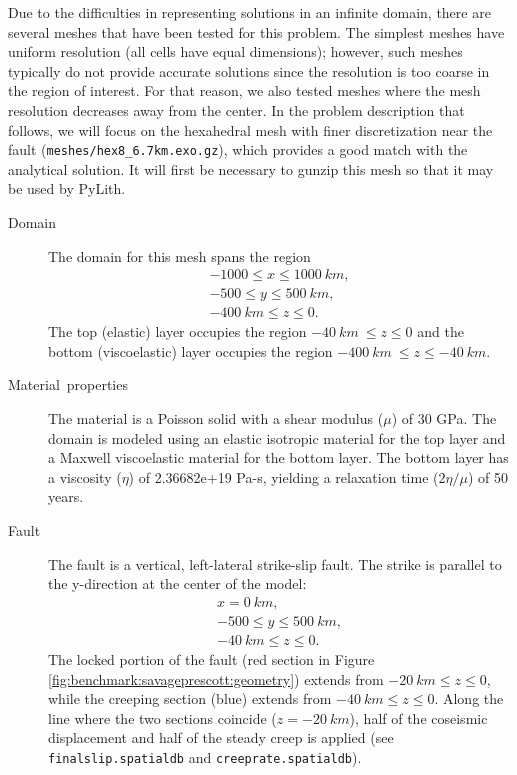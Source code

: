 Due to the difficulties in representing solutions in an infinite domain,
there are several meshes that have been tested for this problem. The
simplest meshes have uniform resolution (all cells have equal dimensions);
however, such meshes typically do not provide accurate solutions since
the resolution is too coarse in the region of interest. For that reason,
we also tested meshes where the mesh resolution decreases away from
the center. In the problem description that follows, we will focus
on the hexahedral mesh with finer discretization near the fault \linebreak{}
(\texttt{meshes/hex8\_6.7km.exo.gz}), which provides a good match
with the analytical solution. It will first be necessary to gunzip
this mesh so that it may be used by PyLith.
\begin{description}
\item [{Domain}] The domain for this mesh spans the region
\begin{gather*}
-1000\leq x\leq1000\ km,\\
-500\leq y\leq500\ km,\\
-400\ km\leq z\leq0.
\end{gather*}
The top (elastic) layer occupies the region $-40\ km\ \leq z\leq0$
and the bottom (viscoelastic) layer occupies the region $-400\ km\ \leq z\leq-40\ km$.
\item [{Material~properties}] The material is a Poisson solid with a shear
modulus ($\mu$) of 30 GPa. The domain is modeled using an elastic
isotropic material for the top layer and a Maxwell viscoelastic material
for the bottom layer. The bottom layer has a viscosity ($\eta$) of
2.36682e+19 Pa-s, yielding a relaxation time ($2\eta/\mu$) of 50
years.
\item [{Fault}] The fault is a vertical, left-lateral strike-slip fault.
The strike is parallel to the y-direction at the center of the model:
\begin{gather*}
x=0\ km,\\
-500\leq y\leq500\ km,\\
-40\ km\leq z\leq0.
\end{gather*}
The locked portion of the fault (red section in Figure \ref{fig:benchmark:savageprescott:geometry})
extends from $-20\: km\leq z\leq0$, while the creeping section (blue)
extends from $-40\: km\leq z\leq0$. Along the line where the two
sections coincide ($z=-20\: km$), half of the coseismic displacement
and half of the steady creep is applied (see \texttt{finalslip.spatialdb}
and \texttt{creeprate.spatialdb}).

\end{description}
